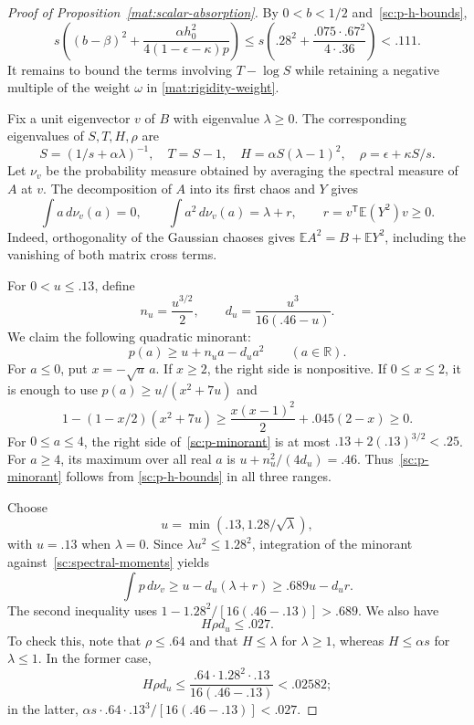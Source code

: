 \documentclass[11pt]{article}
\newcommand{\R}{\mathbb R}
\newcommand{\E}{\mathbb E}
\theoremstyle{definition}
\theoremstyle{remark}
\numberwithin{equation}{section}
\begin{document}
\begin{proof}[Proof of Proposition~\ref{mat:scalar-absorption}]
By $0<b<1/2$ and~\eqref{sc:p-h-bounds},
\begin{equation}\label{sc:y-cost}
 s\left((b-\beta)^2+
 \frac{\alpha h_0^2}{4(1-\epsilon-\kappa)p}\right)
 \le s\left(.28^2+\frac{.075\cdot .67^2}{4\cdot .36}\right)<.111.
\end{equation}
It remains to bound the terms involving $T-\log S$ while retaining a
negative multiple of the weight $\omega$ in
\eqref{mat:rigidity-weight}.

Fix a unit eigenvector $v$ of $B$ with eigenvalue $\lambda\ge0$.
The corresponding eigenvalues of $S,T,H,\rho$
are
\[
 S=(1/s+\alpha\lambda)^{-1},\quad T=S-1,\quad
 H=\alpha S(\lambda-1)^2,\quad \rho=\epsilon+\kappa S/s.
\]
Let $\nu_v$ be the probability measure obtained by averaging the spectral
measure of $A$ at $v$.  The decomposition of $A$ into its first chaos and
$Y$ gives
\begin{equation}\label{sc:spectral-moments}
 \int a\,d\nu_v(a)=0,\qquad
 \int a^2\,d\nu_v(a)=\lambda+r,
 \qquad r=v^{\mathsf T}\E(Y^2)v\ge0.
\end{equation}
Indeed, orthogonality of the Gaussian chaoses gives
$\E A^2=B+\E Y^2$, including the vanishing of both matrix cross terms.

For $0<u\le.13$, define
\[
 n_u=\frac{u^{3/2}}{2},\qquad
 d_u=\frac{u^3}{16(.46-u)}.
\]
We claim the following quadratic minorant:
\begin{equation}\label{sc:p-minorant}
 p(a)\ge u+n_ua-d_ua^2\qquad(a\in\R).
\end{equation}
For $a\le0$, put $x=-\sqrt u\,a$.  If $x\ge2$, the right side is
nonpositive.  If $0\le x\le2$, it is enough to use
$p(a)\ge u/(x^2+7u)$ and
\[
 1-(1-x/2)(x^2+7u)
 \ge \frac{x(x-1)^2}{2}+.045(2-x)\ge0.
\]
For $0\le a\le4$, the right side of~\eqref{sc:p-minorant} is at most
$.13+2(.13)^{3/2}<.25$.  For $a\ge4$, its maximum over all real $a$ is
$u+n_u^2/(4d_u)=.46$.  Thus~\eqref{sc:p-minorant} follows from
\eqref{sc:p-h-bounds} in all three ranges.

Choose
\[
 u=\min(.13,1.28/\sqrt\lambda),
\]
with $u=.13$ when $\lambda=0$.  Since $\lambda u^2\le1.28^2$, integration of the
minorant against~\eqref{sc:spectral-moments} yields
\begin{equation}\label{sc:p-mean}
 \int p\,d\nu_v\ge u-d_u(\lambda+r)
 \ge .689u-d_ur.
\end{equation}
The second inequality uses
$1-1.28^2/[16(.46-.13)]>.689$.
We also have
\begin{equation}\label{sc:rho-loss}
 H\rho d_u\le .027.
\end{equation}
To check this, note that $\rho\le.64$ and that $H\le\lambda$ for $\lambda\ge1$,
whereas $H\le\alpha s$ for $\lambda\le1$.  In the former case,
\[
 H\rho d_u\le
 \frac{.64\cdot1.28^2\cdot.13}{16(.46-.13)}<.02582;
\]
in the latter, $\alpha s\cdot.64\cdot .13^3/[16(.46-.13)]<.027$.


\end{proof}
\end{document}
